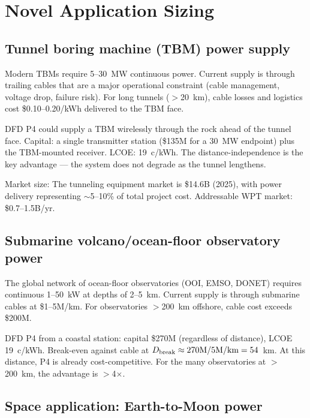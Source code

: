 \documentclass[11pt]{article}
\begin{document}
\section{Novel Application Sizing}
\label{sec:novel-apps}

\subsection{Tunnel boring machine (TBM) power supply}

Modern TBMs require 5--30~MW continuous power. Current supply is through
trailing cables that are a major operational constraint (cable management,
voltage drop, failure risk). For long tunnels ($>$20~km), cable losses
and logistics cost \$0.10--0.20/kWh delivered to the TBM face.

DFD P4 could supply a TBM wirelessly through the rock ahead of the tunnel
face. Capital: a single transmitter station (\$135M for a 30~MW
endpoint) plus the TBM-mounted receiver. LCOE: 19~c/kWh. The
distance-independence is the key advantage --- the system does not degrade
as the tunnel lengthens.

Market size: The tunneling equipment market is \$14.6B (2025), with power
delivery representing $\sim$5--10\% of total project cost. Addressable
WPT market: \$0.7--1.5B/yr.

\subsection{Submarine volcano/ocean-floor observatory power}

The global network of ocean-floor observatories (OOI, EMSO, DONET) requires
continuous 1--50~kW at depths of 2--5~km. Current supply is through
submarine cables at \$1--5M/km. For observatories $>$200~km offshore,
cable cost exceeds \$200M.

DFD P4 from a coastal station: capital \$270M (regardless of distance),
LCOE 19~c/kWh. Break-even against cable at $D_{\rm break} \approx
270\text{M}/5\text{M/km} = 54$~km. At this distance, P4 is already
cost-competitive. For the many observatories at $>$200~km, the advantage
is $>$4$\times$.

\subsection{Space application: Earth-to-Moon power}
\end{document}
